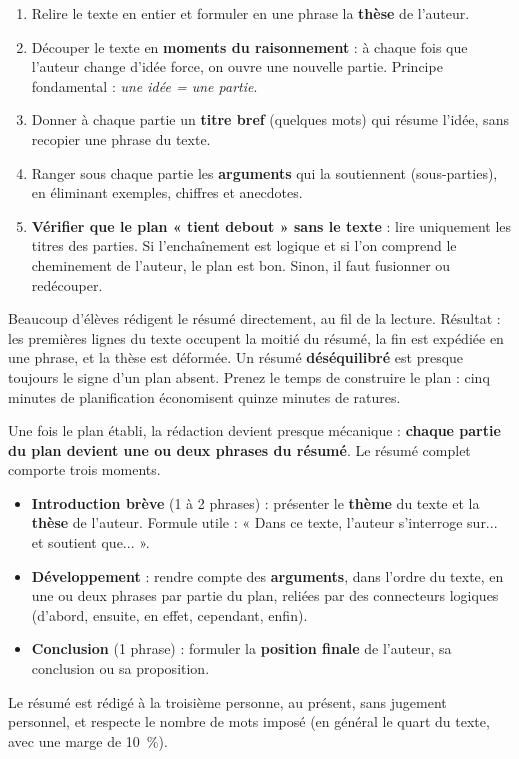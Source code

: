 \documentclass[11pt]{article}
\newcounter{popsec}
\newcounter{popsub}
\newcommand{\courssub}[1]{%
  \stepcounter{popsub}%
  \par\vspace{9pt}\noindent{\popxbold\fontsize{11.5}{13}\selectfont\color{popink}{\color{poporange}\thepopsec.\thepopsub}\hspace{6pt}#1}\par\nopagebreak\vspace{4pt}
}
\begin{document}
\begin{methode}
\begin{enumerate}
\item Relire le texte en entier et formuler en une phrase la \textbf{thèse} de l'auteur.
\item Découper le texte en \textbf{moments du raisonnement} : à chaque fois que l'auteur change d'idée force, on ouvre une nouvelle partie. Principe fondamental : \emph{une idée = une partie}.
\item Donner à chaque partie un \textbf{titre bref} (quelques mots) qui résume l'idée, sans recopier une phrase du texte.
\item Ranger sous chaque partie les \textbf{arguments} qui la soutiennent (sous-parties), en éliminant exemples, chiffres et anecdotes.
\item \textbf{Vérifier que le plan « tient debout » sans le texte} : lire uniquement les titres des parties. Si l'enchaînement est logique et si l'on comprend le cheminement de l'auteur, le plan est bon. Sinon, il faut fusionner ou redécouper.
\end{enumerate}
\end{methode}

\begin{attention}
Beaucoup d'élèves rédigent le résumé directement, au fil de la lecture. Résultat : les premières lignes du texte occupent la moitié du résumé, la fin est expédiée en une phrase, et la thèse est déformée. Un résumé \textbf{déséquilibré} est presque toujours le signe d'un plan absent. Prenez le temps de construire le plan : cinq minutes de planification économisent quinze minutes de ratures.
\end{attention}

\courssub{Du plan au résumé : la rédaction}

Une fois le plan établi, la rédaction devient presque mécanique : \textbf{chaque partie du plan devient une ou deux phrases du résumé}. Le résumé complet comporte trois moments.

\begin{propriete}
\begin{itemize}
\item \textbf{Introduction brève} (1 à 2 phrases) : présenter le \textbf{thème} du texte et la \textbf{thèse} de l'auteur. Formule utile : « Dans ce texte, l'auteur s'interroge sur... et soutient que... ».
\item \textbf{Développement} : rendre compte des \textbf{arguments}, dans l'ordre du texte, en une ou deux phrases par partie du plan, reliées par des connecteurs logiques (d'abord, ensuite, en effet, cependant, enfin).
\item \textbf{Conclusion} (1 phrase) : formuler la \textbf{position finale} de l'auteur, sa conclusion ou sa proposition.
\end{itemize}
Le résumé est rédigé à la troisième personne, au présent, sans jugement personnel, et respecte le nombre de mots imposé (en général le quart du texte, avec une marge de 10~\%).
\end{propriete}
\end{document}
